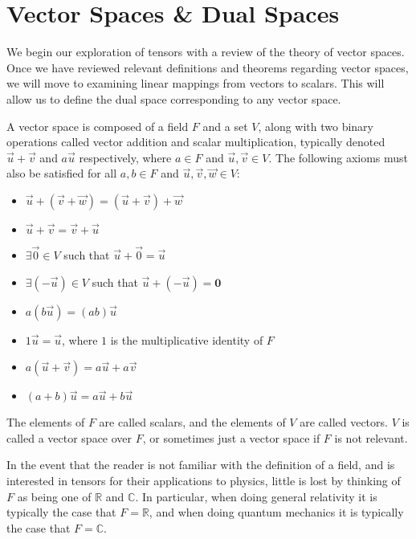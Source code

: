 \documentclass[../main.tex]{subfiles}
\begin{document}
    \section{Vector Spaces \& Dual Spaces}
    We begin our exploration of tensors with a review of the theory of vector spaces. Once we have reviewed relevant definitions and theorems regarding vector spaces, we will move to examining linear mappings from vectors to scalars. This will allow us to define the dual space corresponding to any vector space.
    \begin{definition}
        A vector space is composed of a field \(F\) and a set \(V\), along with two binary operations called vector addition and scalar multiplication, typically denoted \(\vec{u}+\vec{v}\) and \(a\vec{u}\) respectively, where \(a\in{}F\) and \(\vec{u},\vec{v}\in{}V\). The following axioms must also be satisfied for all \(a,b\in{}F\) and \(\vec{u},\vec{v},\vec{w}\in{}V\):
        \begin{itemize}
            \item\(\vec{u}+(\vec{v}+\vec{w})=(\vec{u}+\vec{v})+\vec{w}\)
            \item\(\vec{u}+\vec{v}=\vec{v}+\vec{u}\)
            \item\(\exists{}\vec{0}\in{}V\) such that \(\vec{u}+\vec{0}=\vec{u}\)
            \item\(\exists{}(-\vec{u})\in{}V\) such that \(\vec{u}+(-\vec{u})=\mathbf{0}\)
            \item\(a(b\vec{u})=(ab)\vec{u}\)
            \item\(1\vec{u}=\vec{u}\), where \(1\) is the multiplicative identity of \(F\)
            \item\(a(\vec{u}+\vec{v})=a\vec{u}+a\vec{v}\)
            \item\((a+b)\vec{u}=a\vec{u}+b\vec{u}\)
        \end{itemize}
        The elements of \(F\) are called scalars, and the elements of \(V\) are called vectors. \(V\) is called a vector space over \(F\), or sometimes just a vector space if \(F\) is not relevant.
    \end{definition}
    In the event that the reader is not familiar with the definition of a field, and is interested in tensors for their applications to physics, little is lost by thinking of \(F\) as being one of \(\mathbb{R}\) and \(\mathbb{C}\). In particular, when doing general relativity it is typically the case that \(F=\mathbb{R}\), and when doing quantum mechanics it is typically the case that \(F=\mathbb{C}\).
\end{document}
